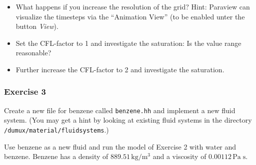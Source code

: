 \begin{itemize}
 \item What happens if you increase the resolution of the grid? Hint: Paraview can visualize the timesteps via the ``Animation View'' (to be enabled unter the button \textit{View}).
 \item Set the CFL-factor to 1 and investigate the saturation: Is the value range reasonable?
 \item Further increase the CFL-factor to 2 and investigate the saturation.
\end{itemize}


\subsubsection{Exercise 3}
Create a new file for benzene called \texttt{benzene.hh} and implement
a new fluid system. (You may get a hint by looking at existing fluid 
systems in the directory \verb+/dumux/material/fluidsystems+.)

Use benzene as a new fluid and run the model of Exercise 2 with water
and benzene. Benzene has a density of $889.51 \, \text{kg} / \text{m}^3$
and a viscosity of $0.00112 \, \text{Pa} \; \text{s}$. 

